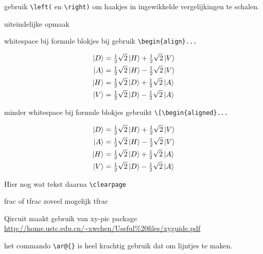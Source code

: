 \documentclass[../../main.tex]{subfiles}
\begin{document}
gebruik \verb+\left(+ en \verb+\right)+ om haakjes in ingewikkelde vergelijkingen te schalen.

uiteindelijke opmaak


whitespace bij formule blokjes bij gebruik \verb+\begin{align}...+

\begin{align}
\ket{D}&=\tfrac{1}{2}\sqrt{2}\ket{H}+\tfrac{1}{2}\sqrt{2}\ket{V}\\
\ket{A}&=\tfrac{1}{2}\sqrt{2}\ket{H}-\tfrac{1}{2}\sqrt{2}\ket{V}\\ 
\ket{H}&=\tfrac{1}{2}\sqrt{2}\ket{D}+\tfrac{1}{2}\sqrt{2}\ket{A}\\
\ket{V}&=\tfrac{1}{2}\sqrt{2}\ket{D}-\tfrac{1}{2}\sqrt{2}\ket{A}
\end{align}%

minder whitespace bij formule blokjes gebruikt \verb+\[\begin{aligned}...+

\[\begin{aligned}
\ket{D}&=\tfrac{1}{2}\sqrt{2}\ket{H}+\tfrac{1}{2}\sqrt{2}\ket{V}\\
\ket{A}&=\tfrac{1}{2}\sqrt{2}\ket{H}-\tfrac{1}{2}\sqrt{2}\ket{V}\\ 
\ket{H}&=\tfrac{1}{2}\sqrt{2}\ket{D}+\tfrac{1}{2}\sqrt{2}\ket{A}\\
\ket{V}&=\tfrac{1}{2}\sqrt{2}\ket{D}-\tfrac{1}{2}\sqrt{2}\ket{A}\\
\end{aligned}\]%

Hier nog wat tekst daarna \verb+\clearpage+

frac of tfrac zoveel mogelijk tfrac


Qircuit
maakt gebruik van xy-pic package
\url{http://home.ustc.edu.cn/~xwchen/Useful%20files/xyguide.pdf}

het commando \verb+\ar@{}+ is heel krachtig gebruik dat om lijntjes te maken.


\clearpage
\end{document}
